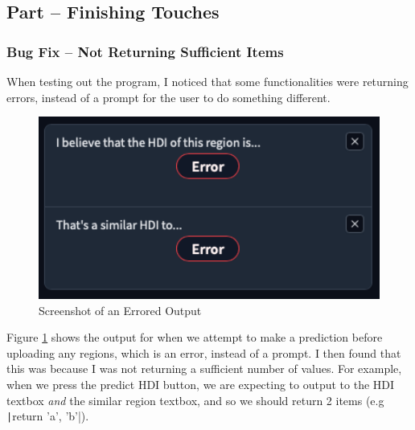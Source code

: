 \documentclass[12pt]{report}
\newcommand{\pil}[1]{\protect\texttt|#1|}
\begin{document}
\begin{center}
\end{center}

\subsection{Part \theparts{} -- Finishing Touches}
\subsubsection{Bug Fix -- Not Returning Sufficient Items}
When testing out the program, I noticed that some functionalities were returning errors, instead of a prompt for the user to do something different.

\begin{figure}[H]
\centering
\includegraphics[width=13cm]{ss22.1.png}
\caption{Screenshot of an Errored Output}\label{fig:ss22.1}
\end{figure}

Figure \ref{fig:ss22.1} shows the output for when we attempt to make a prediction before uploading any regions, which is an error, instead of a prompt. I then found that this was because I was not returning a sufficient number of values. For example, when we press the predict HDI button, we are expecting to output to the HDI textbox \textit{and} the similar region textbox, and so we should return 2 items (e.g \pil{return 'a', 'b'}).
\end{document}
